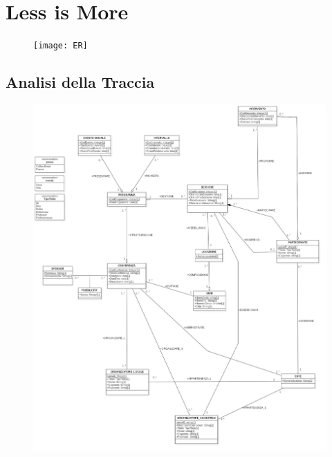 \documentclass[a4page]{article}
\begin{document}
\chapter{Less is More}
\begin{figure}[h!]
\centering
\texttt{[image: ER]}

\end{figure}
\section{Analisi della Traccia}

\begin{figure}[h!]
\centering
\includegraphics[width=17cm]{CSR}

\end{figure}
\newpage
\end{document}
